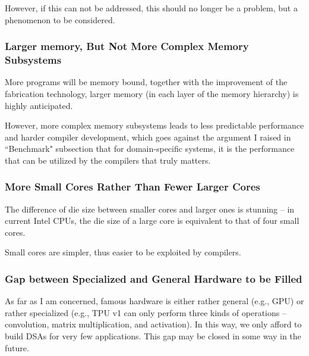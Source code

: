 \documentclass[11pt]{article}
\begin{document}
However, if this can not be addressed, this should no longer be a problem, but a phenomenon to be considered.

\subsubsection*{Larger memory, But Not More Complex Memory Subsystems}
More programs will be memory bound, together with the improvement of the fabrication technology, larger memory (in each layer of the memory hierarchy) is highly anticipated.

However, more complex memory subsystems leads to less predictable performance and harder compiler development, which goes against the argument I raised in ``Benchmark" subsection that for domain-specific systems, it is the performance that can be utilized by the compilers that truly matters.

\subsubsection*{More Small Cores Rather Than Fewer Larger Cores}
The difference of die size between smaller cores and larger ones is stunning -- in current Intel CPUs, the die size of a large core is equivalent to that of four small cores.

Small cores are simpler, thus easier to be exploited by compilers.

\subsubsection*{Gap between Specialized and General Hardware to be Filled}
As far as I am concerned, famous hardware is either rather general (e.g., GPU) or rather specialized (e.g., TPU v1 can only perform three kinds of operations -- convolution, matrix multiplication, and activation).
In this way, we only afford to build DSAs for very few applications.
This gap may be closed in some way in the future.
\end{document}
